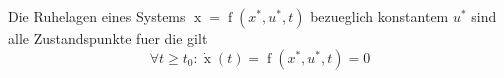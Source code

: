 Die Ruhelagen eines Systems $\operatorname{x} = \operatorname{f}(x^*, u^*,t)$ bezueglich konstantem $u^*$ sind alle Zustandspunkte fuer die gilt
$$\forall t \geq t_0 :\dot{\operatorname{x}}(t) = \operatorname{f}(x^*, u^*, t) = 0$$
